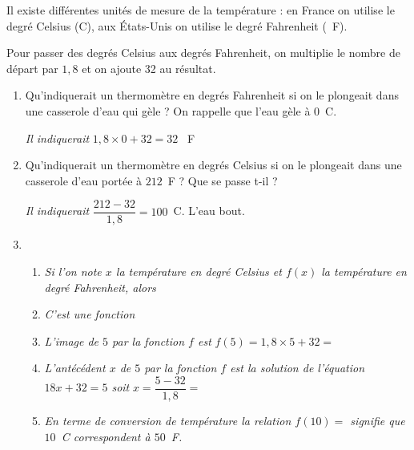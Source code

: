 
\medskip
 
Il existe différentes unités de mesure de la température : en France on utilise le degré Celsius (\degres C), aux États-Unis on utilise le degré Fahrenheit (\degres~F).

\medskip
 
Pour passer des degrés Celsius aux degrés Fahrenheit, on multiplie le nombre de départ par $1,8$ et on ajoute 32 au résultat.

\medskip
 
\begin{enumerate}
\item Qu'indiquerait un thermomètre en degrés Fahrenheit si on le plongeait dans une casserole d'eau qui gèle ? On rappelle que l'eau gèle à 0~\degres C. 

\textit{Il indiquerait} $1,8\times 0+32=32$ \degres~F
\item Qu'indiquerait un thermomètre en degrés Celsius si on le plongeait dans une 
casserole d'eau portée à $212$~\degres F ? Que se passe t-il ?

\textit{Il indiquerait} $\dfrac{212-32}{1,8}=100$\degres~C. L'eau bout.
\item 
	\begin{enumerate}
		\item \textit{Si l'on note $x$ la température en degré Celsius et $f(x)$ la température en degré Fahrenheit, alors} 
		\item \textit{C'est une fonction }
		\item \textit{L'image de $5$ par la fonction $f$ est} $f(5)=1,8\times 5+32=$ 
		\item \textit{L'antécédent $x$ de $5$ par la fonction $f$ est la solution de l'équation $18x+32=5$ soit} $x=\dfrac{5-32}{1,8}=$
		\item \textit{En terme de conversion de température la relation $f(10) =$ signifie que $10$\degres~C correspondent à $50$\degres~F.}
	\end{enumerate} 
\end{enumerate} 
